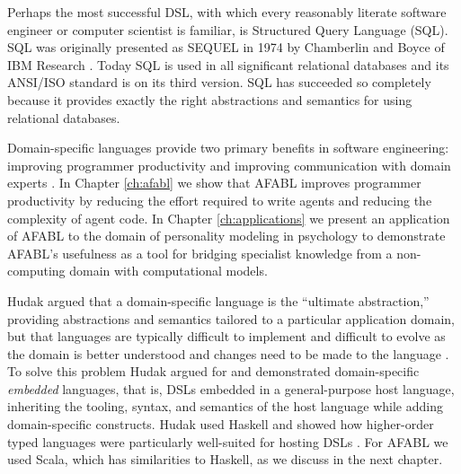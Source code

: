 Perhaps the most successful DSL, with which every reasonably literate software engineer or computer scientist is familiar, is Structured Query Language (SQL). SQL was originally presented as SEQUEL in 1974 by Chamberlin and Boyce of IBM Research \cite{chamberlin1974sequel}. Today SQL is used in all significant relational databases and its ANSI/ISO standard is on its third version. SQL has succeeded so completely because it provides exactly the right abstractions and semantics for using relational databases.

Domain-specific languages provide two primary benefits in software engineering: improving programmer productivity and improving communication with domain experts \cite{fowler2011domain}. In Chapter \ref{ch:afabl} we show that AFABL improves programmer productivity by reducing the effort required to write agents and reducing the complexity of agent code. In Chapter \ref{ch:applications} we present an application of AFABL to the domain of personality modeling in psychology to demonstrate AFABL's usefulness as a tool for bridging specialist knowledge from a non-computing domain with computational models.

Hudak argued that a domain-specific language is the ``ultimate abstraction,'' providing abstractions and semantics tailored to a particular application domain, but that languages are typically difficult to implement and difficult to evolve as the domain is better understood and changes need to be made to the language \cite{hudak1996building}. To solve this problem Hudak argued for and demonstrated domain-specific {\it embedded} languages, that is, DSLs embedded in a general-purpose host language, inheriting the tooling, syntax, and semantics of the host language while adding domain-specific constructs. Hudak used Haskell and showed how higher-order typed languages were particularly well-suited for hosting DSLs \cite{hudak1998modular}. For AFABL we used Scala, which has similarities to Haskell, as we discuss in the next chapter.

